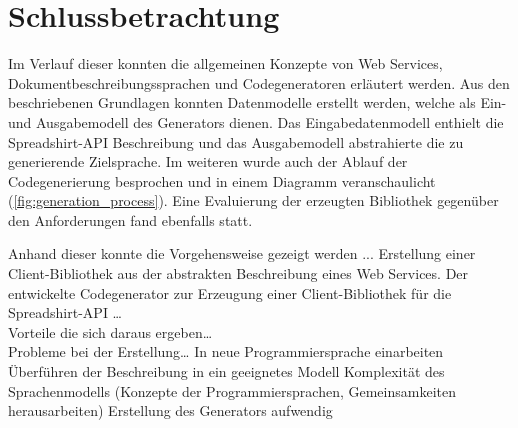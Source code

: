 \chapter{Schlussbetrachtung}
\label{chap:summary}


Im Verlauf dieser \thesisDesignator{} konnten die allgemeinen Konzepte von Web Services, Dokumentbeschreibungssprachen und Codegeneratoren erläutert werden. Aus den beschriebenen Grundlagen konnten Datenmodelle erstellt werden, welche als Ein- und Ausgabemodell des Generators dienen. Das Eingabedatenmodell enthielt die Spreadshirt-\gls{API} Beschreibung und das Ausgabemodell abstrahierte die zu generierende Zielsprache. Im weiteren wurde auch der Ablauf der Codegenerierung besprochen und in einem Diagramm veranschaulicht (\cref{fig:generation_process}). Eine Evaluierung der erzeugten Bibliothek gegenüber den Anforderungen fand ebenfalls statt.

Anhand dieser \thesisDesignator{} konnte die Vorgehensweise gezeigt werden ...
Erstellung einer Client-Bibliothek aus der abstrakten Beschreibung eines Web Services.
Der entwickelte Codegenerator zur Erzeugung einer Client-Bibliothek für die Spreadshirt-\gls{API} \ldots\\
Vorteile die sich daraus ergeben\ldots\\

Probleme bei der Erstellung\ldots
    In neue Programmiersprache einarbeiten
    Überführen der Beschreibung in ein geeignetes Modell
    Komplexität des Sprachenmodells (Konzepte der Programmiersprachen, Gemeinsamkeiten herausarbeiten)
    Erstellung des Generators aufwendig 


\label{sec:prospect}

%
